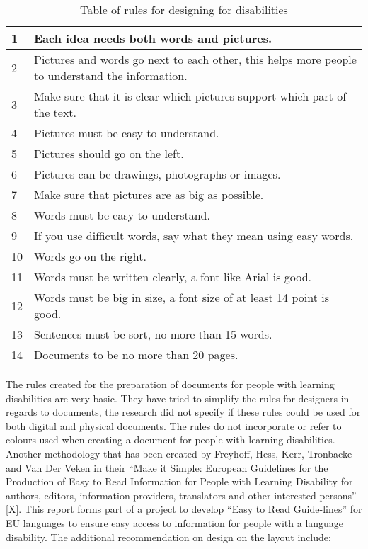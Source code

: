\begin{table} [h]
    \centering
\begin{tabular}{ | m{2em} | m{7cm}|} 
\hline
1 & Each idea needs both words and pictures.   \\ 
\hline
2 & Pictures and words go next to each other, this helps more people to understand the information. \\ 
\hline
3 & Make sure that it is clear which pictures support which part of the text. \\ 
\hline
4 & Pictures must be easy to understand. \\ 
\hline
5 & Pictures should go on the left. \\ 
\hline
6 & Pictures can be drawings, photographs or images. \\
\hline
7 & Make sure that pictures are as big as possible.  \\
\hline
8 & Words must be easy to understand. \\
\hline
9 & If you use difficult words, say what they mean using easy words. \\
\hline
10 & Words go on the right. \\
\hline
11 & Words must be written clearly, a font like Arial is good. \\
\hline
12 & Words must be big in size, a font size of at least 14 point is good. \\
\hline
13 & Sentences must be sort, no more than 15 words. \\
\hline
14 & Documents to be no more than 20 pages. \\
\hline
\end{tabular}
\centering
\caption{Table of rules for designing for disabilities}
    \label{tab:my_label}
\end{table}

The rules created for the preparation of documents for people with learning disabilities are very basic. They have tried to simplify the rules for designers in regards to documents, the research did not specify if these rules could be used for both digital and physical documents. The rules do not incorporate or refer to colours used when creating a document for people with learning disabilities. 
\newpage
Another methodology that has been created by Freyhoff, Hess, Kerr, Tronbacke and Van Der Veken in their “Make it Simple: European Guidelines for the Production of Easy to Read Information for People with Learning Disability for authors, editors, information providers, translators and other interested persons” [X]. This report forms part of a project to develop “Easy to Read Guide-lines” for EU languages to ensure easy access to information for people with a language disability. The additional recommendation on design on the layout include:

